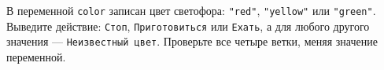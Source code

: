 \begin{taskbox}[Светофор]
В переменной \texttt{color} записан цвет светофора: \texttt{"red"}, \texttt{"yellow"} или \texttt{"green"}. Выведите действие: \texttt{Стоп}, \texttt{Приготовиться} или \texttt{Ехать}, а для любого другого значения --- \texttt{Неизвестный цвет}. Проверьте все четыре ветки, меняя значение переменной.
\end{taskbox}
